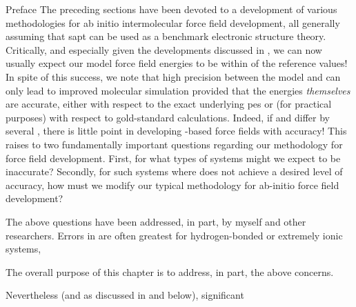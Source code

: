 \begin{section}{Preface}
The preceding sections have been devoted to a development of various methodologies for ab initio intermolecular force
field development, all generally assuming that \acrfull{sapt} can be used as a benchmark electronic structure
theory. Critically, and especially given the developments discussed in ,
we can now usually expect our model force field energies to be within
 of the \sapt reference values! In spite of this
success, we note that high precision between the model
and \sapt can only lead to improved molecular simulation provided that the \sapt energies \emph{themselves} are
accurate, either with respect to the exact underlying \acrfull{pes} or (for practical
purposes) with respect to gold-standard \ccsdt calculations. Indeed, if \sapt
and \ccsdt differ by several \kjmol{}, there is little point in developing
\sapt-based force fields with  accuracy! This raises to two
fundamentally important questions regarding our methodology for force field
development. First, for what types of systems might we expect \sapt to be inaccurate? Secondly,
for such systems where \sapt does not achieve a desired level of accuracy, how
must we modify our typical methodology for ab-initio force field development?

The above questions have been addressed, in part, by myself and other
researchers. Errors in \sapt are often greatest for
hydrogen-bonded\cite{Parker2014a} or extremely ionic systems,

The overall purpose of this chapter is to address, in part, the above
concerns. 

Nevertheless (and as discussed in  and below),
significant \sapt 

\end{section}
